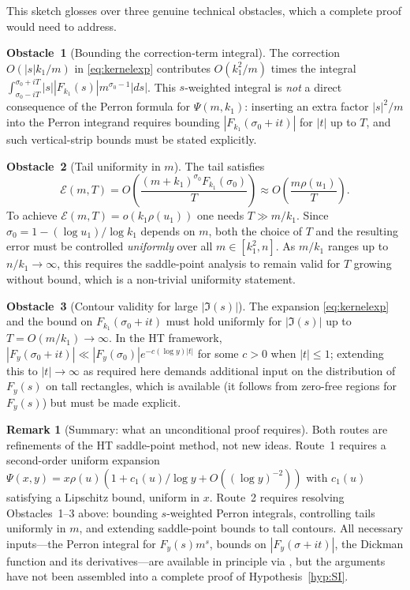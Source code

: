 \documentclass[12pt]{article}
\theoremstyle{definition}
\newtheorem{remark}[theorem]{Remark}
\begin{document}
This sketch glosses over three genuine technical obstacles, which
a complete proof would need to address.

\textbf{Obstacle~1} (Bounding the correction-term integral).
The correction $O(|s|k_1/m)$ in \eqref{eq:kernelexp} contributes
$O(k_1^2/m)$ times the integral $\int_{\sigma_0-iT}^{\sigma_0+iT}|s||F_{k_1}(s)|m^{\sigma_0-1}|ds|$.
This $s$-weighted integral is \emph{not} a direct consequence of
the Perron formula for $\Psi(m,k_1)$: inserting an extra factor $|s|^2/m$
into the Perron integrand requires bounding $|F_{k_1}(\sigma_0+it)|$
for $|t|$ up to $T$, and such vertical-strip bounds must be stated explicitly.

\textbf{Obstacle~2} (Tail uniformity in $m$).
The tail satisfies
\[
  \mathcal{E}(m,T) = O\!\left(\frac{(m+k_1)^{\sigma_0}F_{k_1}(\sigma_0)}{T}\right)
  \approx O\!\left(\frac{m\rho(u_1)}{T}\right).
\]
To achieve $\mathcal{E}(m,T) = o(k_1\rho(u_1))$ one needs $T \gg m/k_1$.
Since $\sigma_0 = 1 - (\log u_1)/\log k_1$ depends on $m$,
both the choice of $T$ and the resulting error must be controlled
\emph{uniformly} over all $m \in [k_1^2, n]$.
As $m/k_1$ ranges up to $n/k_1 \to \infty$, this requires
the saddle-point analysis to remain valid for $T$ growing without bound,
which is a non-trivial uniformity statement.

\textbf{Obstacle~3} (Contour validity for large $|\Im(s)|$).
The expansion \eqref{eq:kernelexp} and the bound on $F_{k_1}(\sigma_0+it)$
must hold uniformly for $|\Im(s)|$ up to $T = O(m/k_1) \to \infty$.
In the HT framework, $|F_y(\sigma_0+it)| \ll |F_y(\sigma_0)|e^{-c(\log y)|t|}$
for some $c > 0$ when $|t| \leq 1$; extending this to $|t| \to \infty$
as required here demands additional input on the distribution of $F_y(s)$
on tall rectangles, which is available (it follows from zero-free regions for
$F_y(s)$) but must be made explicit.

\begin{remark}[Summary: what an unconditional proof requires]\label{rem:obstacles}
Both routes are refinements of the HT saddle-point method, not new ideas.
Route~1 requires a second-order uniform expansion
$\Psi(x,y) = x\rho(u)(1 + c_1(u)/\log y + O((\log y)^{-2}))$
with $c_1(u)$ satisfying a Lipschitz bound, uniform in $x$.
Route~2 requires resolving Obstacles~1--3 above: bounding
$s$-weighted Perron integrals, controlling tails uniformly in $m$,
and extending saddle-point bounds to tall contours.
All necessary inputs---the Perron integral for $F_y(s)m^s$,
bounds on $|F_y(\sigma+it)|$, the Dickman function and its derivatives---are
available in principle via \cite{HT,Ten}, but the arguments have not been
assembled into a complete proof of Hypothesis~\ref{hyp:SI}.
\end{remark}
\end{document}
